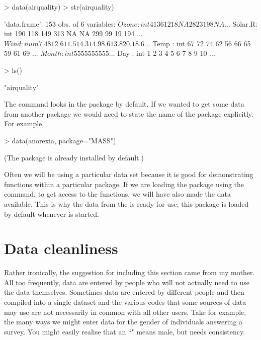 \begin{Schunk}
\begin{Sinput}
> data(airquality) 
> str(airquality) 
\end{Sinput}
\begin{Soutput}
'data.frame':	153 obs. of  6 variables:
 $ Ozone  : int  41 36 12 18 NA 28 23 19 8 NA ...
 $ Solar.R: int  190 118 149 313 NA NA 299 99 19 194 ...
 $ Wind   : num  7.4 8 12.6 11.5 14.3 14.9 8.6 13.8 20.1 8.6 ...
 $ Temp   : int  67 72 74 62 56 66 65 59 61 69 ...
 $ Month  : int  5 5 5 5 5 5 5 5 5 5 ...
 $ Day    : int  1 2 3 4 5 6 7 8 9 10 ...
\end{Soutput}
\begin{Sinput}
> ls() 
\end{Sinput}
\begin{Soutput}
[1] "airquality"
\end{Soutput}
\end{Schunk}

The  command looks in the  package by default. If we wanted to get some data from another package we would need to state the name of the package explicitly. For example, 

\begin{Schunk}
\begin{Sinput}
> data(anorexia, package="MASS") 
\end{Sinput}
\end{Schunk}

(The  package is already installed by default.)  
 
Often we will be using a particular data set because it is good for demonstrating functions within a particular package. If we are loading the package using the  command, to get access to the functions, we will have also made the data available. This is why the data from the  is ready for use; this package is loaded by default whenever \R{} is started. 
 
 
\section{Data cleanliness} 
 
Rather ironically, the suggestion for including this section came from my mother. All too frequently, data are entered by people who will not actually need to use the data themselves. Sometimes data are entered by different people and then compiled into a single dataset and the various codes that some sources of data may use are not necessarily in common with all other users. Take for example, the many ways we might enter data for the gender of individuals answering a survey. You might easily realise that an ``" means male, but \R{} needs consistency. 
 
